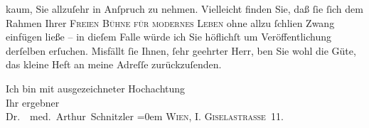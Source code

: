                kaum, Sie allzuſehr in Anſpruch zu nehmen. Vielleicht finden Sie, daß{ }ſie{ }ſich dem
               Rahmen Ihrer \textsc{Freien Bühne für modernes Leben} ohne allzu{ }ſchli{\geminationm}en Zwang einfügen ließe – in
               dieſem Falle würde ich Sie höflichſt um Veröffentlichung derſelben erſuchen. Misfällt{ }ſie Ihnen,{ }ſehr geehrter Herr, {\pb}ben Sie wohl die Güte, das kleine Heft an meine Adreſſe zurückzuſenden.\pend
           
\pstart
           Ich bin mit ausgezeichneter Hochachtung{\\[\baselineskip]}Ihr ergebner{\\[\baselineskip]}\spacefill\mbox{Dr.  med. Arthur Schnitzler}\pend
           \leftskip=0em{}
\pstart
           \noindent{}\textsc{Wien, I. Giselastraße 11.}\pend
           \endnumbering{}  \newcommand{\dateiname}{L00005}\newcommand{\titel}{Arthur Schnitzler an Wilhelm Bölsche, [Anfang September] 1890}\newcommand{\editorInnen}{Martin Anton Müller und Gerd-Hermann Susen}
